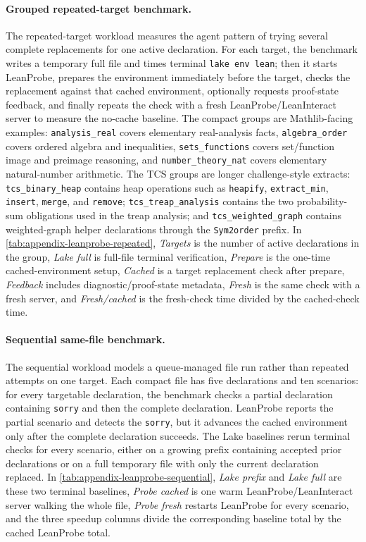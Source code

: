 \documentclass{article}
\begin{document}
\paragraph{Grouped repeated-target benchmark.}
The repeated-target workload measures the agent pattern of trying several complete replacements for one active declaration.
For each target, the benchmark writes a temporary full file and times terminal \texttt{lake env lean}; then it starts LeanProbe, prepares the environment immediately before the target, checks the replacement against that cached environment, optionally requests proof-state feedback, and finally repeats the check with a fresh LeanProbe/LeanInteract server to measure the no-cache baseline.
The compact groups are Mathlib-facing examples: \texttt{analysis\_real} covers elementary real-analysis facts, \texttt{algebra\_order} covers ordered algebra and inequalities, \texttt{sets\_functions} covers set/function image and preimage reasoning, and \texttt{number\_theory\_nat} covers elementary natural-number arithmetic.
The TCS groups are longer challenge-style extracts: \texttt{tcs\_binary\_heap} contains heap operations such as \texttt{heapify}, \texttt{extract\_min}, \texttt{insert}, \texttt{merge}, and \texttt{remove}; \texttt{tcs\_treap\_analysis} contains the two probability-sum obligations used in the treap analysis; and \texttt{tcs\_weighted\_graph} contains weighted-graph helper declarations through the \texttt{Sym2order} prefix.
In \cref{tab:appendix-leanprobe-repeated}, \emph{Targets} is the number of active declarations in the group, \emph{Lake full} is full-file terminal verification, \emph{Prepare} is the one-time cached-environment setup, \emph{Cached} is a target replacement check after prepare, \emph{Feedback} includes diagnostic/proof-state metadata, \emph{Fresh} is the same check with a fresh server, and \emph{Fresh/cached} is the fresh-check time divided by the cached-check time.

\paragraph{Sequential same-file benchmark.}
The sequential workload models a queue-managed file run rather than repeated attempts on one target.
Each compact file has five declarations and ten scenarios: for every targetable declaration, the benchmark checks a partial declaration containing \texttt{sorry} and then the complete declaration.
LeanProbe reports the partial scenario and detects the \texttt{sorry}, but it advances the cached environment only after the complete declaration succeeds.
The Lake baselines rerun terminal checks for every scenario, either on a growing prefix containing accepted prior declarations or on a full temporary file with only the current declaration replaced.
In \cref{tab:appendix-leanprobe-sequential}, \emph{Lake prefix} and \emph{Lake full} are these two terminal baselines, \emph{Probe cached} is one warm LeanProbe/LeanInteract server walking the whole file, \emph{Probe fresh} restarts LeanProbe for every scenario, and the three speedup columns divide the corresponding baseline total by the cached LeanProbe total.
\end{document}
